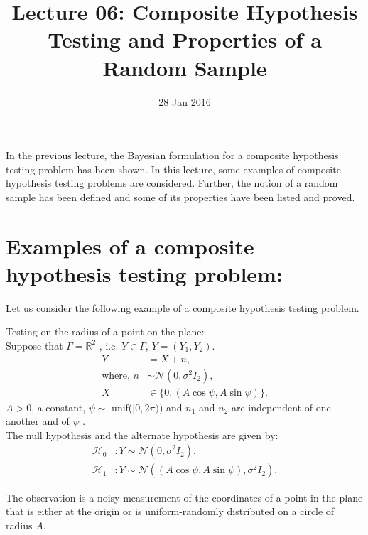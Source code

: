 \documentclass[a4paper,english,12pt]{article}
\title{Lecture 06: Composite Hypothesis Testing and Properties of a Random Sample}
\date{28 Jan 2016}
\author{}
\begin{document}
\maketitle
In the previous lecture, the Bayesian formulation for a composite hypothesis testing problem has been shown. In this lecture, some examples of composite hypothesis testing problems are considered. Further, the notion of a random sample has been defined and some of its properties have been listed and proved.

\section{Examples of a composite hypothesis testing problem:}
Let us consider the following example of a composite hypothesis testing problem.

\begin{exmp}
Testing on the radius of a point on the plane:\\
Suppose that $\Gamma = {\mathbb{R}}^2$ , i.e. $Y \in \Gamma$, $Y = (Y_1,Y_2).$
\begin{align*}
Y &= X + n,\\
\text{where, }
n &\sim \mathcal{N}(0,\sigma^2I_2),\nonumber\\
X &\in \{0,(A\cos\psi,A\sin\psi)\}.\nonumber
\end{align*}
$A > 0$, a constant, $\psi \sim$ unif($[0,2\pi)$) and $n_1$ and $n_2$ are independent of one another and of $\psi$ .\\

The null hypothesis and the alternate hypothesis are given by:
\begin{align*}
\mathcal{H}_0 &: Y \sim \mathcal{N}(0,\sigma^2I_2).\\
\mathcal{H}_1 &: Y \sim \mathcal{N}((A\cos\psi,A\sin\psi),\sigma^2I_2).
\end{align*}

The observation is a noisy measurement of the coordinates of a point in the plane that is either at the origin or is uniform-randomly distributed on a circle of radius $A$.


\end{exmp}
\end{document}
